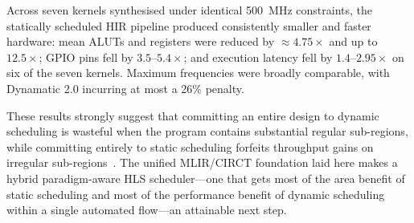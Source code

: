 \documentclass[sigplan,10pt,review,nonacm]{acmart}
\begin{document}
Across seven kernels synthesised under identical 500~MHz constraints,
the statically scheduled HIR pipeline produced consistently smaller
and faster hardware: mean ALUTs and registers were reduced by
${\approx}4.75\times$ and up to $12.5\times$; GPIO pins fell by
$3.5$--$5.4\times$; and execution latency fell by $1.4$--$2.95\times$
on six of the seven kernels. Maximum frequencies were broadly
comparable, with Dynamatic 2.0 incurring at most a 26\% penalty.

These results strongly suggest that committing an entire design to
dynamic scheduling is wasteful when the program contains substantial
regular sub-regions, while committing entirely to static scheduling
forfeits throughput gains on irregular sub-regions~\cite{9378784}.
The unified MLIR/CIRCT foundation laid here makes a hybrid
paradigm-aware HLS scheduler---one that gets most of the area benefit
of static scheduling and most of the performance benefit of dynamic
scheduling within a single automated flow---an attainable next step.



\end{document}
